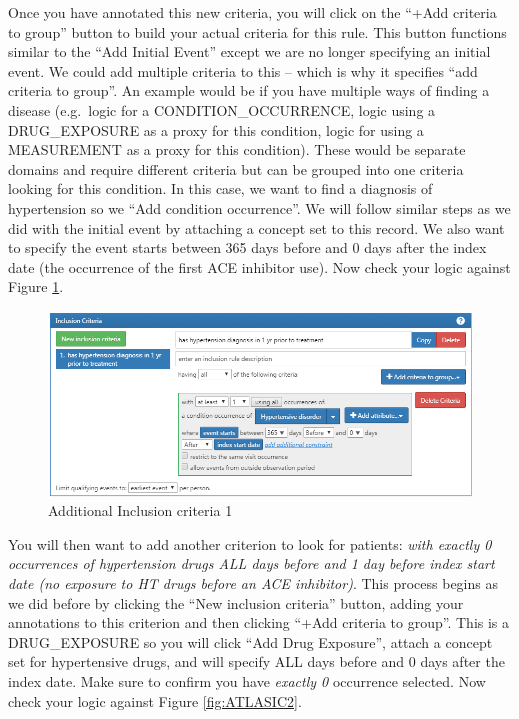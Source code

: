 \documentclass[11pt]{book}
\theoremstyle{definition}
\theoremstyle{definition}
\theoremstyle{definition}
\theoremstyle{remark}
\begin{document}
Once you have annotated this new criteria, you will click on the ``+Add
criteria to group'' button to build your actual criteria for this rule.
This button functions similar to the ``Add Initial Event'' except we are
no longer specifying an initial event. We could add multiple criteria to
this -- which is why it specifies ``add criteria to group''. An example
would be if you have multiple ways of finding a disease (e.g.~logic for
a CONDITION\_OCCURRENCE, logic using a DRUG\_EXPOSURE as a proxy for
this condition, logic for using a MEASUREMENT as a proxy for this
condition). These would be separate domains and require different
criteria but can be grouped into one criteria looking for this
condition. In this case, we want to find a diagnosis of hypertension so
we ``Add condition occurrence''. We will follow similar steps as we did
with the initial event by attaching a concept set to this record. We
also want to specify the event starts between 365 days before and 0 days
after the index date (the occurrence of the first ACE inhibitor use).
Now check your logic against Figure \ref{fig:ATLASIC1}.

\begin{figure}

{\centering \includegraphics[width=1\linewidth]{images/Cohorts/ATLAS-IC1} 

}

\caption{Additional Inclusion criteria 1}\label{fig:ATLASIC1}
\end{figure}

You will then want to add another criterion to look for patients:
\emph{with exactly 0 occurrences of hypertension drugs ALL days before
and 1 day before index start date (no exposure to HT drugs before an ACE
inhibitor)}. This process begins as we did before by clicking the ``New
inclusion criteria'' button, adding your annotations to this criterion
and then clicking ``+Add criteria to group''. This is a DRUG\_EXPOSURE
so you will click ``Add Drug Exposure'', attach a concept set for
hypertensive drugs, and will specify ALL days before and 0 days after
the index date. Make sure to confirm you have \emph{exactly 0}
occurrence selected. Now check your logic against Figure
\ref{fig:ATLASIC2}.
\end{document}
